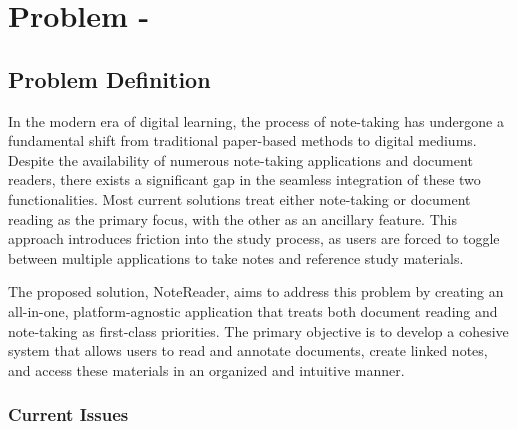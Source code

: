 \chapter{Problem - \thesistitle}
\label{chap:problem}


\section{Problem Definition}

In the modern era of digital learning, the process of note-taking has undergone a fundamental shift from traditional paper-based methods to digital mediums. Despite the availability of numerous note-taking applications and document readers, there exists a significant gap in the seamless integration of these two functionalities. Most current solutions treat either note-taking or document reading as the primary focus, with the other as an ancillary feature. This approach introduces friction into the study process, as users are forced to toggle between multiple applications to take notes and reference study materials.

The proposed solution, NoteReader, aims to address this problem by creating an all-in-one, platform-agnostic application that treats both document reading and note-taking as first-class priorities. The primary objective is to develop a cohesive system that allows users to read and annotate documents, create linked notes, and access these materials in an organized and intuitive manner.


\subsection{Current Issues}

